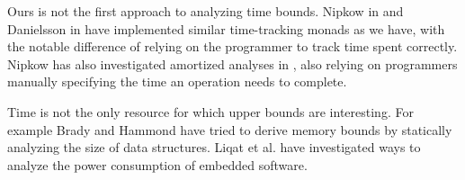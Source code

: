 Ours is not the first approach to analyzing time bounds. Nipkow in \cite{nipkow:2017:verified-root-balanced-trees} and Danielsson in \cite{danielsson:2008:time-complexity-analysis} have implemented similar time-tracking monads as we have, with the notable difference of relying on the programmer to track time spent correctly. Nipkow has also investigated amortized analyses in \cite{nipkow:2015:amortizedverified}, also relying on programmers manually specifying the time an operation needs to complete.

Time is not the only resource for which upper bounds are interesting. For example Brady and Hammond \cite{brady:2006:programsize} have tried to derive memory bounds by statically analyzing the size of data structures. Liqat et al. \cite{liqatetal:2013:energyconsumption} have investigated ways to analyze the power consumption of embedded software.

